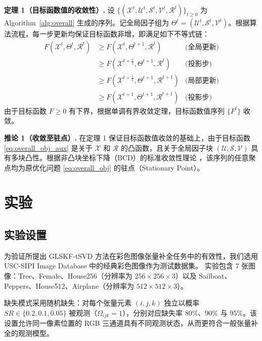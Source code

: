 \documentclass[UTF8]{ctexart}
\begin{document}
\vspace{0.5em}
\noindent\textbf{定理 1（目标函数值的收敛性）.}
设 $\{(\mathcal{X}^{t},\mathcal{U}^{t},\mathcal{S}^{t},\mathcal{V}^{t},\mathcal{R}^{t})\}_{t\ge0}$ 为 Algorithm~\ref{alg:overall} 生成的序列。记全局因子组为 $\Theta^t = (\mathcal{U}^t, \mathcal{S}^t, \mathcal{V}^t)$。根据算法流程，每一步更新均保证目标函数非增，即满足如下不等式链：
\begin{equation}
\begin{aligned}
F(\mathcal{X}^t, \Theta^t, \mathcal{R}^t) 
&\ge F(\mathcal{X}^t, \Theta^{t+1}, \mathcal{R}^t) & \text{(全局更新)} \\
&\ge F(\mathcal{X}^{t+\frac{1}{2}}, \Theta^{t+1}, \mathcal{R}^t) & \text{(投影步)} \\
&\ge F(\mathcal{X}^{t+\frac{1}{2}}, \Theta^{t+1}, \mathcal{R}^{t+1}) & \text{(局部更新)} \\
&\ge F(\mathcal{X}^{t+1}, \Theta^{t+1}, \mathcal{R}^{t+1}) & \text{(投影步)}
\end{aligned}
\end{equation}
由于目标函数 $F \ge 0$ 有下界，根据单调有界收敛定理，目标函数值序列 $\{F^{t}\}$ 收敛。

\vspace{0.5em}
\noindent\textbf{推论 1（收敛至驻点）.} 
在定理 1 保证目标函数值收敛的基础上，由于目标函数 \eqref{eq:overall_obj_aux} 是关于 $\mathcal{X}$ 和 $\mathcal{R}$ 的凸函数，且关于全局因子块 $(\mathcal{U}, \mathcal{S}, \mathcal{V})$ 具有多块凸性。根据非凸块坐标下降（BCD）的标准收敛性理论 \cite{bertsekas1999nonlinear}，该序列的任意聚点均为原优化问题 \eqref{eq:overall_obj} 的驻点（Stationary Point）。

\section{实验}
\subsection{实验设置}
为验证所提出 GLSKF-tSVD 方法在彩色图像张量补全任务中的有效性，我们选用 USC-SIPI Image Database 中的经典彩色图像作为测试数据集\cite{usc_sipi_database}。
实验包含 7 张图像：Tree、Female、House256（分辨率为 $256\times256\times3$）以及 Sailboat、Peppers、House512、Airplane（分辨率为 $512\times512\times3$）。

缺失模式采用随机缺失：对每个张量元素 $(i,j,k)$ 独立以概率 $SR\in\{0.2,0.1,0.05\}$ 被观测（$\Omega_{ijk}=1$），分别对应缺失率 $80\%$、$90\%$ 与 $95\%$。该设置允许同一像素位置的 RGB 三通道具有不同观测状态，从而更符合一般张量补全的观测模型。
\end{document}
